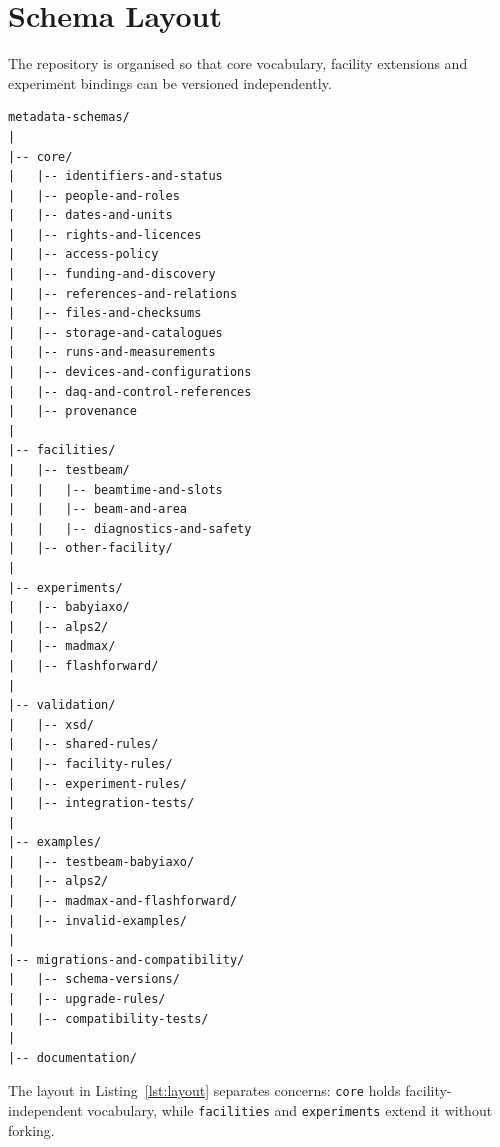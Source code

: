 \chapter{Schema Layout}
\label{ch:layout}

The repository is organised so that core vocabulary, facility extensions and
experiment bindings can be versioned independently.

\begin{lstlisting}[style=tree, caption={Directory layout of the metadata-schema repository.},
                   label={lst:layout}]
metadata-schemas/
|
|-- core/
|   |-- identifiers-and-status
|   |-- people-and-roles
|   |-- dates-and-units
|   |-- rights-and-licences
|   |-- access-policy
|   |-- funding-and-discovery
|   |-- references-and-relations
|   |-- files-and-checksums
|   |-- storage-and-catalogues
|   |-- runs-and-measurements
|   |-- devices-and-configurations
|   |-- daq-and-control-references
|   |-- provenance
|
|-- facilities/
|   |-- testbeam/
|   |   |-- beamtime-and-slots
|   |   |-- beam-and-area
|   |   |-- diagnostics-and-safety
|   |-- other-facility/
|
|-- experiments/
|   |-- babyiaxo/
|   |-- alps2/
|   |-- madmax/
|   |-- flashforward/
|
|-- validation/
|   |-- xsd/
|   |-- shared-rules/
|   |-- facility-rules/
|   |-- experiment-rules/
|   |-- integration-tests/
|
|-- examples/
|   |-- testbeam-babyiaxo/
|   |-- alps2/
|   |-- madmax-and-flashforward/
|   |-- invalid-examples/
|
|-- migrations-and-compatibility/
|   |-- schema-versions/
|   |-- upgrade-rules/
|   |-- compatibility-tests/
|
|-- documentation/
\end{lstlisting}

The layout in Listing~\ref{lst:layout} separates concerns: \texttt{core} holds
facility-independent vocabulary, while \texttt{facilities} and
\texttt{experiments} extend it without forking.
